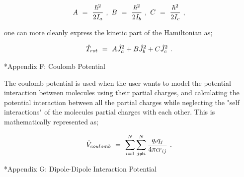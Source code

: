 \documentclass[11pt]{article}
\makeatletter
\let\workreportsection\section
\renewcommand{\section}{\@ifstar{\workreportstarsection}{\workreportsection}}
\newcommand{\workreportstarsection}[1]{\workreportsection*{#1}\addcontentsline{toc}{section}{#1}}
\makeatother
\begin{document}
\begin{equation} \label{wr-eq-65-1}
A \hspace{0.125cm} = \hspace{0.125cm} \frac{\hbar^2}{2 I_{a}} \hspace{0.125cm} , \hspace{0.125cm} B \hspace{0.125cm} = \hspace{0.125cm} \frac{\hbar^2}{2 I_{b}} \hspace{0.125cm} , \hspace{0.125cm} C \hspace{0.125cm} = \hspace{0.125cm} \frac{\hbar^2}{2 I_{c}} \hspace{0.125cm} ,
\end{equation}

one can more cleanly express the kinetic part of the Hamiltonian as;

\begin{equation} \label{wr-eq-66-2}
\hat{T}_{rot} \hspace{0.125cm} = \hspace{0.125cm} A \hat{J}^{2}_{a} + B \hat{J}^{2}_{b} + C \hat{J}^{2}_{c} \hspace{0.125cm} .
\end{equation}

\hypertarget{wr-appendix-f}{}
\section*{Appendix F: Coulomb Potential}
\label{wr-app-potengc-1}

The coulomb potential is used when the user wants to model the potential interaction between molecules using their partial charges, and calculating the potential interaction between all the partial charges while neglecting the "self interactions" of the molecules partial charges with each other. This is mathematically represented as;

\begin{equation} \label{wr-eq-67-1}
\hat{V}_{coulomb} \hspace{0.125cm} = \hspace{0.125cm} \sum_{i = 1}^{N} \sum_{j \neq i}^{N} \frac{q_i q_j}{4 \pi \epsilon r_{ij}} \hspace{0.125cm} .
\end{equation}

\hypertarget{wr-appendix-g}{}
\section*{Appendix G: Dipole-Dipole Interaction Potential}
\label{wr-app-potengdd-1}
\end{document}
